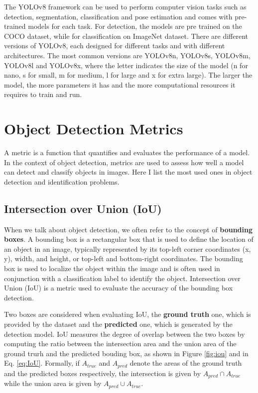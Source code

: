The YOLOv8 framework can be used to perform computer vision tasks such as detection, segmentation, classification and pose estimation and comes with pre-trained models for each task. For detection, the models are pre trained on the COCO dataset, while for classification on ImageNet dataset. 
There are different versions of YOLOv8, each designed for different tasks and with different architectures. The most common versions are YOLOv8n, YOLOv8s, YOLOv8m, YOLOv8l and YOLOv8x, where the letter indicates the size of the model (n for nano, s for small, m for medium, l for large and x for extra large). The larger the model, the more parameters it has and the more computational resources it requires to train and run.

\section{Object Detection Metrics}
\label{sec:metrics}
A metric is a function that quantifies and evaluates the performance of a model. In the context of object detection, metrics are used to assess how well a model can detect and classify objects in images. Here I list the most used ones in object detection and identification problems.

\subsection*{Intersection over Union (IoU)}
When we talk about object detection, we often refer to the concept of \textbf{bounding boxes}. A bounding box is a rectangular box that is used to define the location of an object in an image, typically represented by its top-left corner coordinates (x, y), width, and height, or top-left and bottom-right coordinates. The bounding box is used to localize the object within the image and is often used in conjunction with a classification label to identify the object.
Intersection over Union (IoU) is a metric used to evaluate the accuracy of the bounding box detection. 

Two boxes are considered when evaluating IoU, the \textbf{ground truth} one, which is provided by the dataset and the \textbf{predicted} one, which is generated by the detection model. 
IoU measures the degree of overlap between the two boxes by computing the ratio between the intersection area and the union area of the ground trurh and the predicted bouding box, as shown in Figure \ref{fig:iou} and in Eq. \ref{eq:IoU}. 
Formally, if $A_{true}$ and $A_{pred}$ denote the areas of the ground truth and the predicted boxes respectively, the intersection is given by $A_{pred}\cap A_{true}$ while the union area is given by $A_{pred} \cup A_{true}$.

